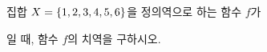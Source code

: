 집합 $X=\{1{,}\mkern3mu\mathopen{}2{,}\mkern3mu\mathopen{}3{,}\mkern3mu\mathopen{}4{,}\mkern3mu\mathopen{}5{,}\mkern3mu\mathopen{}6\}$을 정의역으로 하는 함수 $f$가 \par\smallskip{}\par\smallskip\noindent 일 때, 함수 $f$의 치역을 구하시오.
